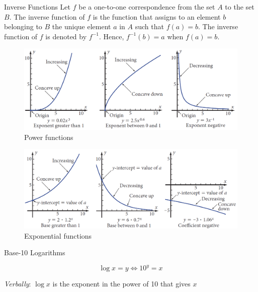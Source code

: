 \begin{definition}{Inverse Functions}
Let $f$ be a one-to-one correspondence from the set $A$ to the set $B$. The inverse function of $f$ is the function that assigns to an element $b$ belonging to $B$ the unique element $a$ in $A$ such that $f(a)=b$. The inverse function of $f$ is denoted by $f^{-1}$. Hence, $f^{-1}(b)=a$ when $f(a)=b$.    
\end{definition}

\begin{figure}[htbp]
    \centering
    \includegraphics[width=1\textwidth]{figure/book3.png} %
    \caption{Power functions}
    \label{fig:book_image3}
\end{figure}

\begin{figure}[htbp]
    \centering
    \includegraphics[width=1\textwidth]{figure/book4.png} %
    \caption{Exponential functions}
    \label{fig:book_image4}
\end{figure}

\begin{definition}{Base-10 Logarithms}

\[
\log x=y \iff 10^y=x
\]

\textit{Verbally}: $\log x$ is the exponent in the power of 10 that gives $x$   
\end{definition}

